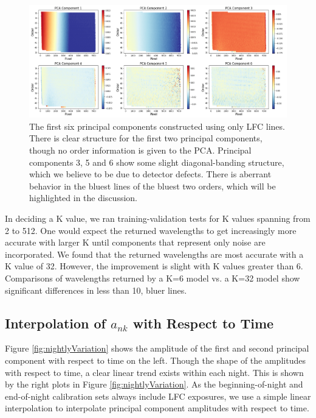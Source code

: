 \documentclass[12pt, letterpaper]{article}
\begin{document}
\begin{figure}[t]
\centering
\includegraphics[width=\textwidth]{Figures/pcsLfc6.png}
\caption{The first six principal components constructed using only LFC lines.  There is clear structure for the first two principal components, though no order information is given to the PCA.  Principal components 3, 5 and 6 show some slight diagonal-banding structure, which we believe to be due to detector defects.  There is aberrant behavior in the bluest lines of the bluest two orders, which will be highlighted in the discussion.}
\label{fig:pcLfc}
\end{figure}

In deciding a K value, we ran training-validation tests for K values spanning from 2 to 512.  One would expect the returned wavelengths to get increasingly more accurate with larger K until components that represent only noise are incorporated.  We found that the returned wavelengths are most accurate with a K value of 32.  However, the improvement is slight with K values greater than 6.  Comparisons of wavelengths returned by a K=6 model vs. a K=32 model show significant differences in less than 10, bluer lines.

\subsection{Interpolation of $a_{nk}$ with Respect to Time}
Figure \ref{fig:nightlyVariation} shows the amplitude of the first and second principal component with respect to time on the left.  Though the shape of the amplitudes with respect to time, a clear linear trend exists within each night.  This is shown by the right plots in Figure  \ref{fig:nightlyVariation}.  As the beginning-of-night and end-of-night calibration sets always include LFC exposures, we use a simple linear interpolation to interpolate principal component amplitudes with respect to time.
\end{document}
